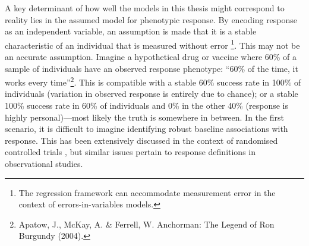 A key determinant of how well the models in this thesis might correspond to reality lies in the assumed model for phenotypic response.
By encoding response as an independent variable, an assumption is made that it is a stable characteristic of an individual that is measured without error%
\footnote{The regression framework can accommodate measurement error in the context of errors-in-variables models.}.
This may not be an accurate assumption.
Imagine a hypothetical drug or vaccine where 60\% of a sample of individuals have an observed response phenotype: \enquote{60\% of the time, it works every time}\footnote{Apatow, J., McKay, A. \& Ferrell, W. Anchorman: The Legend of Ron Burgundy (2004).}.
This is compatible with a stable 60\% success rate in 100\% of individuals (variation in observed response is entirely due to chance);
or a stable 100\% success rate in 60\% of individuals and 0\% in the other 40\% (response is highly personal)---most likely the truth is somewhere in between.
In the first scenario, it is difficult to imagine identifying robust baseline associations with response.
This has been extensively discussed in the context of randomised controlled trials \autocite{senn2018StatisticalPitfallsPersonalized}, 
but similar issues pertain to response definitions in observational studies.

